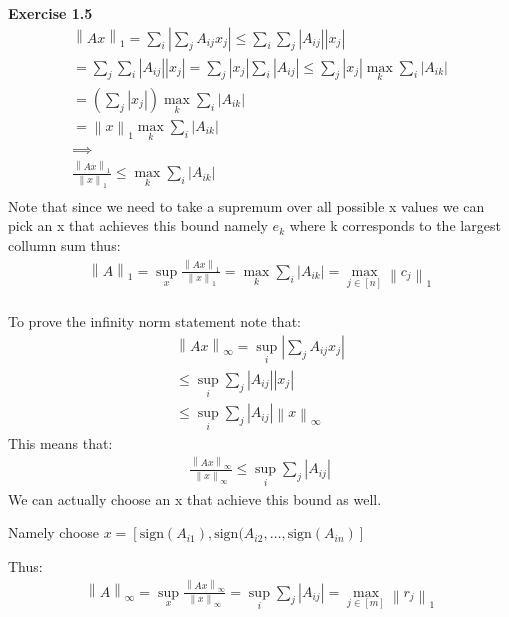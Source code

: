 \documentclass[12pt]{article}
\newenvironment{exercise}[1]{\vspace{.1in}\noindent\textbf{Exercise #1 \hspace{.05em}}}{}
\newcommand{\norm}[1]{\left\lVert#1\right\rVert}
\begin{document}
\begin{exercise}{1.5}
	\begin{align}
		\norm{Ax}_1=\sum_{i}|\sum_{j}A_{ij}x_j|\leq \sum_i\sum_j |A_{ij}||x_j|                        \\
		= \sum_j\sum_i |A_{ij}||x_j|=\sum_j |x_j|\sum_{i}|A_{ij}|\leq \sum_j|x_j|\max_k\sum_i|A_{ik}| \\
		=(\sum_j|x_j|)\max_k\sum_i|A_{ik}|                                                            \\
		=\norm{x}_1\max_k\sum_i|A_{ik}|                                                               \\
		\implies                                                                                      \\
		\frac{\norm{Ax}_1}{\norm{x}_1   }\leq \max_k\sum_i|A_{ik}|                                    \\
	\end{align}
	Note that since we need to take a supremum over all possible x values we can pick an x that achieves this bound namely $e_k$ where k corresponds to the largest collumn sum thus:
	\begin{align}
		\norm{A}_1=	\sup_x \frac{\norm{Ax}_1}{\norm{x}_1   }= \max_k\sum_i|A_{ik}|=\max_{j\in[n]}\norm{c_j}_1 \\
	\end{align}

	To prove the infinity norm statement note that:
	\begin{align}
		\norm{Ax}_\infty = \sup_i|\sum_{j}A_{ij}x_j| \\
		\leq \sup_i \sum_j|A_{ij}||x_j|              \\
		\leq \sup_i \sum_j|A_{ij}|\norm{x}_\infty
	\end{align}
	This means that:
	\begin{align}
		\frac{\norm{Ax}_\infty}{\norm{x}_\infty}\leq \sup_i \sum_j|A_{ij}|
	\end{align}
	We can actually choose an x that achieve this bound as well.

	Namely choose $x=\left[\text{sign}(A_{i1}),\text{sign}(A_{i2},\dots,\text{sign}(A_{in})\right]$

	Thus:
	\begin{align}
		\norm{A}_\infty =	\sup_x \frac{\norm{Ax}_\infty}{\norm{x}_\infty   }=\sup_i \sum_j|A_{ij}|=\max_{j\in[m]}\norm{r_j}_1
	\end{align}
\end{exercise}
\end{document}
